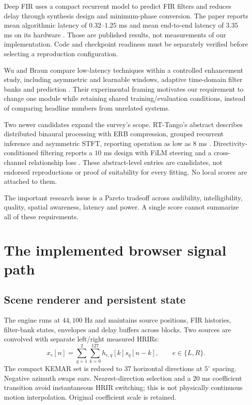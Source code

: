 \documentclass[11pt,a4paper]{article}
\begin{document}
Deep FIR uses a compact recurrent model to predict FIR filters and reduces delay through synthesis design and minimum-phase conversion. The paper reports mean algorithmic latency of $0.32$--$1.25$ ms and mean end-to-end latency of $3.35$ ms on its hardware \cite{deepfir}. Those are published results, not measurements of our implementation. Code and checkpoint readiness must be separately verified before selecting a reproduction configuration.

Wu and Braun compare low-latency techniques within a controlled enhancement study, including asymmetric and learnable windows, adaptive time-domain filter banks and prediction \cite{wu2025}. Their experimental framing motivates our requirement to change one module while retaining shared training/evaluation conditions, instead of comparing headline numbers from unrelated systems.

Two newer candidates expand the survey's scope. RT-Tango's abstract describes distributed binaural processing with ERB compression, grouped recurrent inference and asymmetric STFT, reporting operation as low as $8$ ms \cite{rttango}. Directivity-conditioned filtering reports a $10$ ms design with FiLM steering and a cross-channel relationship loss \cite{uphaus}. These abstract-level entries are candidates, not endorsed reproductions or proof of suitability for every fitting. No local scores are attached to them.

The important research issue is a Pareto tradeoff across audibility, intelligibility, quality, spatial awareness, latency and power. A single score cannot summarize all of these requirements.
\newpage
\section{The implemented browser signal path}
\subsection{Scene renderer and persistent state}
The engine runs at $44{,}100$ Hz and maintains source positions, FIR histories, filter-bank states, envelopes and delay buffers across blocks. Two sources are convolved with separate left/right measured HRIRs:
\begin{equation}
 x_e[n]=\sum_{q=1}^{2}\sum_{k=0}^{127}h_{e,q}[k]s_q[n-k],\qquad e\in\{L,R\}.
\end{equation}
The compact KEMAR set is reduced to 37 horizontal directions at $5^{\circ}$ spacing. Negative azimuth swaps ears. Nearest-direction selection and a 20 ms coefficient transition avoid instantaneous HRIR switching; this is not physically continuous motion interpolation. Original coefficient scale is retained.
\end{document}
